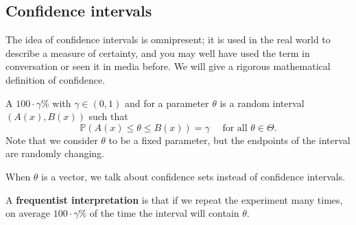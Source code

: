 \documentclass[egregdoesnotlikesansseriftitles,a4paper]{scrartcl}
\begin{document}
\subsection{Confidence intervals}
The idea of confidence intervals is omnipresent; it is used in the real world to describe a measure of certainty, and you may well have used the term in conversation or seen it in media before. We will give a rigorous mathematical definition of confidence.
\begin{definition*}
      A $100 \cdot \gamma$\%  with $\gamma \in (0,1)$ and for a parameter $\theta$ is a random interval $(A (x),B (x))$ such that \[
      \mathbb{P}(A (x) \leq \theta \leq B (x)) = \gamma \quad \text{ for all } \theta \in \Theta
      .\] Note that we consider $\theta$ to be a fixed parameter, but the endpoints of the interval are randomly changing.
\end{definition*}
\begin{remark}
     When $\theta$ is a vector, we talk about confidence sets instead of confidence intervals.
\end{remark}
A \textbf{frequentist interpretation} is that if we repeat the experiment many times, on average $100 \cdot \gamma \%$ of the time the interval will contain $\theta$. 
\end{document}
